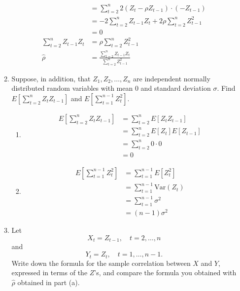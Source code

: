 \documentclass[12pt]{article}
\begin{document}
\begin{enumerate}
\begin{enumerate}
\begin{align*}
            &= \sum_{t = 2}^{n} 2(Z_t - \rho Z_{t-1}) \cdot (-Z_{t-1}) \\
            &= -2 \sum_{t = 2}^{n} Z_{t-1} Z_t + 2 \rho \sum_{t = 2}^{n} Z_{t-1}^2 \\
            &= 0 \\
            \sum_{t = 2}^{n} Z_{t-1} Z_t &= \rho \sum_{t = 2}^{n} Z_{t-1}^2 \\
            \hat{\rho} &= \frac{\sum_{t = 2}^{n} Z_{t-1} Z_t}{\sum_{t = 2}^{n} Z_{t-1}^2}
        \end{align*}
        \item Suppose, in addition, that \( Z_1, Z_2, \ldots, Z_n \) are independent normally distributed random variables with mean 0 and standard deviation \( \sigma \).
            Find $E\left[\sum_{t=2}^n Z_t Z_{t-1}\right]$ and $E\left[\sum_{t=1}^{n-1} Z_t^2\right]$.
            \begin{enumerate}
                \item 
                \begin{align*}
                    E\left[\sum_{t=2}^n Z_t Z_{t-1}\right] &= \sum_{t=2}^n E[Z_t Z_{t-1}] \\
                    &= \sum_{t=2}^n E[Z_t] E[Z_{t-1}] \\
                    &= \sum_{t=2}^n 0 \cdot 0 \\
                    &= 0
                \end{align*}
                \item 
                \begin{align*}
                    E\left[\sum_{t=1}^{n-1} Z_t^2\right] &= \sum_{t=1}^{n-1} E[Z_t^2] \\
                    &= \sum_{t=1}^{n-1} \text{Var}(Z_t) \\
                    &= \sum_{t=1}^{n-1} \sigma^2 \\
                    &= (n-1) \sigma^2
                \end{align*}
            \end{enumerate} 
        \item 
            Let  
            \[ X_t = Z_{t-1}, \quad t = 2, \ldots, n \]  
            and  
            \[ Y_t = Z_t, \quad t = 1, \ldots, n-1. \]  
            Write down the formula for the sample correlation between \( X \) and \( Y \),
            expressed in terms of the \( Z \)'s, and compare the formula you obtained with 
            \( \hat{\rho} \) obtained in part (a).
            \begin{align*}

\end{align*}
\end{enumerate}
\end{enumerate}
\end{document}
